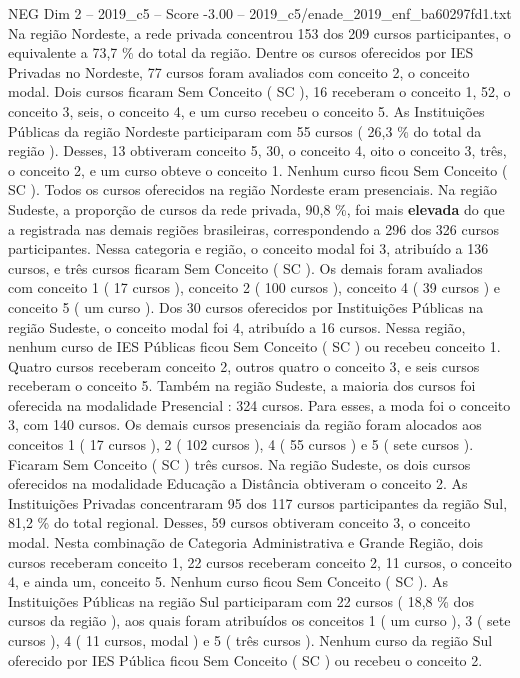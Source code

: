 \begin{textsample}{NEG Dim 2 – 2019\_c5 – Score -3.00 – 2019\_c5/enade\_2019\_enf\_ba60297fd1.txt}
Na região Nordeste, a rede privada concentrou 153 dos 209 cursos participantes, o equivalente a 73,7 \% do total da região.
Dentre os cursos oferecidos por IES Privadas no Nordeste, 77 cursos foram avaliados com conceito 2, o conceito modal.
Dois cursos ficaram Sem Conceito ( SC ), 16 receberam o conceito 1, 52, o conceito 3, seis, o conceito 4, e um curso recebeu o conceito 5.
As Instituições Públicas da região Nordeste participaram com 55 cursos ( 26,3 \% do total da região ).
Desses, 13 obtiveram conceito 5, 30, o conceito 4, oito o conceito 3, três, o conceito 2, e um curso obteve o conceito 1.
Nenhum curso ficou Sem Conceito ( SC ).
Todos os cursos oferecidos na região Nordeste eram presenciais.
Na região Sudeste, a proporção de cursos da rede privada, 90,8 \%, foi mais \textbf{elevada} do que a registrada nas demais regiões brasileiras, correspondendo a 296 dos 326 cursos participantes.
Nessa categoria e região, o conceito modal foi 3, atribuído a 136 cursos, e três cursos ficaram Sem Conceito ( SC ).
Os demais foram avaliados com conceito 1 ( 17 cursos ), conceito 2 ( 100 cursos ), conceito 4 ( 39 cursos ) e conceito 5 ( um curso ).
Dos 30 cursos oferecidos por Instituições Públicas na região Sudeste, o conceito modal foi 4, atribuído a 16 cursos.
Nessa região, nenhum curso de IES Públicas ficou Sem Conceito ( SC ) ou recebeu conceito 1.
Quatro cursos receberam conceito 2, outros quatro o conceito 3, e seis cursos receberam o conceito 5.
Também na região Sudeste, a maioria dos cursos foi oferecida na modalidade Presencial : 324 cursos.
Para esses, a moda foi o conceito 3, com 140 cursos.
Os demais cursos presenciais da região foram alocados aos conceitos 1 ( 17 cursos ), 2 ( 102 cursos ), 4 ( 55 cursos ) e 5 ( sete cursos ).
Ficaram Sem Conceito ( SC ) três cursos.
Na região Sudeste, os dois cursos oferecidos na modalidade Educação a Distância obtiveram o conceito 2.
As Instituições Privadas concentraram 95 dos 117 cursos participantes da região Sul, 81,2 \% do total regional.
Desses, 59 cursos obtiveram conceito 3, o conceito modal.
Nesta combinação de Categoria Administrativa e Grande Região, dois cursos receberam conceito 1, 22 cursos receberam conceito 2, 11 cursos, o conceito 4, e ainda um, conceito 5.
Nenhum curso ficou Sem Conceito ( SC ).
As Instituições Públicas na região Sul participaram com 22 cursos ( 18,8 \% dos cursos da região ), aos quais foram atribuídos os conceitos 1 ( um curso ), 3 ( sete cursos ), 4 ( 11 cursos, modal ) e 5 ( três cursos ).
Nenhum curso da região Sul oferecido por IES Pública ficou Sem Conceito ( SC ) ou recebeu o conceito 2.

\end{textsample}
